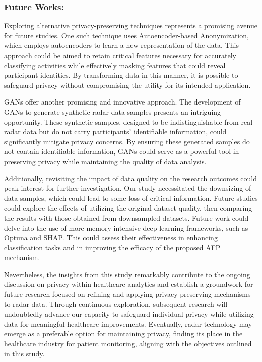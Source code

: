 \documentclass{l4proj}
\begin{document}
\subsubsection{Future Works:}
Exploring alternative privacy-preserving techniques represents a promising avenue for future studies. One such technique uses Autoencoder-based Anonymization, which employs autoencoders to learn a new representation of the data. This approach could be aimed to retain critical features necessary for accurately classifying activities while effectively masking features that could reveal participant identities. By transforming data in this manner, it is possible to safeguard privacy without compromising the utility for its intended application.

GANs offer another promising and innovative approach. The development of GANs to generate synthetic radar data samples presents an intriguing opportunity. These synthetic samples, designed to be indistinguishable from real radar data but do not carry participants' identifiable information, could significantly mitigate privacy concerns. By ensuring these generated samples do not contain identifiable information, GANs could serve as a powerful tool in preserving privacy while maintaining the quality of data analysis.

Additionally, revisiting the impact of data quality on the research outcomes could peak interest for further investigation. Our study necessitated the downsizing of data samples, which could lead to some loss of critical information. Future studies could explore the effects of utilizing the original dataset quality, then comparing the results with those obtained from downsampled datasets. Future work could delve into the use of more memory-intensive deep learning frameworks, such as Optuna and SHAP. This could assess their effectiveness in enhancing classification tasks and in improving the efficacy of the proposed AFP mechanism.

Nevertheless, the insights from this study remarkably contribute to the ongoing discussion on privacy within healthcare analytics and establish a groundwork for future research focused on refining and applying privacy-preserving mechanisms to radar data. Through continuous exploration, subsequent research will undoubtedly advance our capacity to safeguard individual privacy while utilizing data for meaningful healthcare improvements. Eventually, radar technology may emerge as a preferable option for maintaining privacy, finding its place in the healthcare industry for patient monitoring, aligning with the objectives outlined in this study.
%
% 
\end{document}
